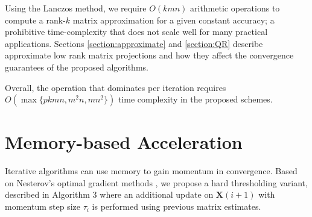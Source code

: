 \documentclass[twocolumn]{svjour3}
\newcommand{\signal}{\boldsymbol{X}}
\newcommand{\numsam}{p}
\newcommand{\rank}{k}
\begin{document}
Using the Lanczos method, we require $ O(\rank m n) $ arithmetic operations to compute a rank-$ \rank $ matrix approximation for a given constant accuracy; a prohibitive time-complexity that does not scale well for many practical applications. Sections \ref{section:approximate} and \ref{section:QR} describe approximate low rank matrix projections and how they affect the convergence guarantees of the proposed algorithms.

Overall, the operation that dominates per iteration requires $ O(\max\lbrace \numsam \rank m n, m^2 n ,m n^2\rbrace) $ time complexity in the proposed schemes. 

\section{Memory-based Acceleration}{\label{sec:memory}}
Iterative algorithms can use memory to gain momentum in convergence. Based on Nesterov's optimal gradient methods \cite{nesterov2007gradient}, we propose a hard thresholding variant, described in Algorithm 3 where an additional update on $\signal(i+1)$ with momentum step size $\tau_i$ is performed using previous matrix estimates.
\end{document}
